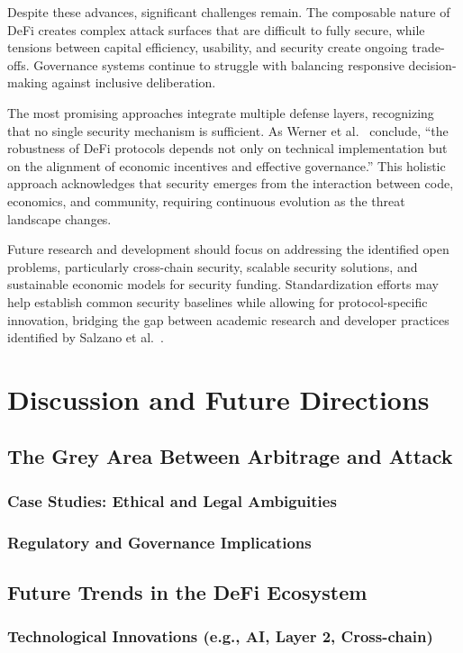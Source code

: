 \documentclass[conference]{IEEEtran}
\begin{document}
    Despite these advances, significant challenges remain. The composable nature of DeFi creates complex attack surfaces that are difficult to fully secure, while tensions between capital efficiency, usability, and security create ongoing trade-offs. Governance systems continue to struggle with balancing responsive decision-making against inclusive deliberation.

    The most promising approaches integrate multiple defense layers, recognizing that no single security mechanism is sufficient. As Werner et al.~\cite{werner2021sok} conclude, ``the robustness of DeFi protocols depends not only on technical implementation but on the alignment of economic incentives and effective governance.'' This holistic approach acknowledges that security emerges from the interaction between code, economics, and community, requiring continuous evolution as the threat landscape changes.

    Future research and development should focus on addressing the identified open problems, particularly cross-chain security, scalable security solutions, and sustainable economic models for security funding. Standardization efforts may help establish common security baselines while allowing for protocol-specific innovation, bridging the gap between academic research and developer practices identified by Salzano et al.~\cite{salzano2025bridging}.

\section{Discussion and Future Directions}
\subsection{The Grey Area Between Arbitrage and Attack}
    \subsubsection{Case Studies: Ethical and Legal Ambiguities}
    \subsubsection{Regulatory and Governance Implications}
\subsection{Future Trends in the DeFi Ecosystem}
    \subsubsection{Technological Innovations (e.g., AI, Layer 2, Cross-chain)}
\end{document}
